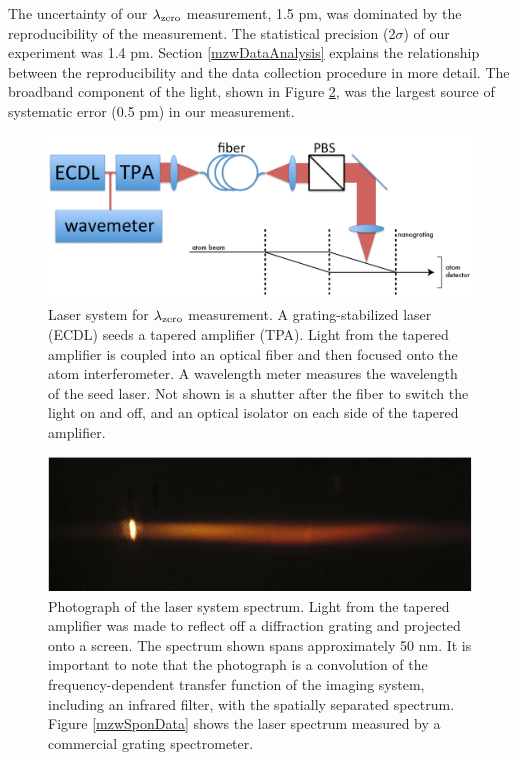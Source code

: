 The uncertainty of our $\lambdaZero$ measurement, 1.5 pm, was dominated by the reproducibility of the measurement. The statistical precision (2$\sigma$) of our experiment was 1.4 pm. Section \ref{mzwDataAnalysis} explains the relationship between the reproducibility and the data collection procedure in more detail. The broadband component of the light, shown in Figure \ref{ASEgratingPic}, was the largest source of systematic error (0.5 pm) in our measurement.


\begin{figure}
\includegraphics[width=1\textwidth]{Figures/mzwLaserSystem2.png}
\caption[Laser system for $\lambdaZero$ measurement.]{\label{mzwLaserSystem}Laser system for $\lambdaZero$ measurement. A grating-stabilized laser (ECDL) seeds a tapered amplifier (TPA). Light from the tapered amplifier is coupled into an optical fiber and then focused onto the atom interferometer. A wavelength meter measures the wavelength of the seed laser. Not shown is a shutter after the fiber to switch the light on and off, and an optical isolator on each side of the tapered amplifier.}
\end{figure}




\begin{figure}
\centerline{\includegraphics[width=.90\textwidth]{Figures/ASEpicture.png}}
\caption[Photograph of laser system spectrum.]{\label{ASEgratingPic}Photograph of the laser system spectrum. Light from the tapered amplifier was made to reflect off a diffraction grating and projected onto a screen. The spectrum shown spans approximately 50 nm. It is important to note that the photograph is a convolution of the frequency-dependent transfer function of the imaging system, including an infrared filter, with the spatially separated spectrum. Figure \ref{mzwSponData} shows the laser spectrum measured by a commercial grating spectrometer.}
\end{figure}


